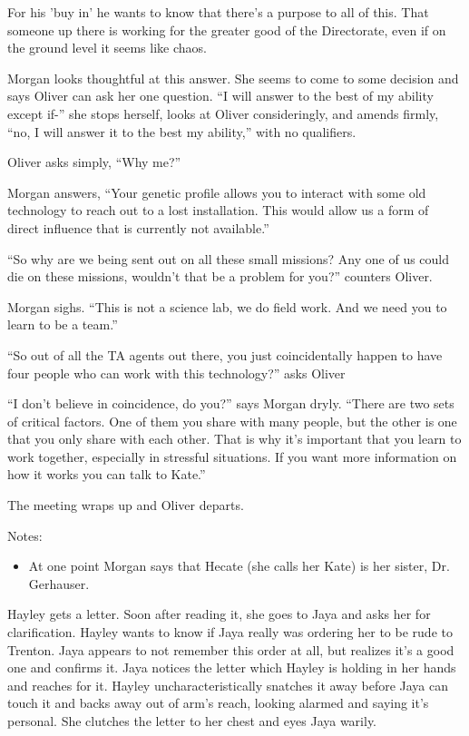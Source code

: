 For his 'buy in' he wants to know that there's a purpose to all of this.  That someone up there is working for the greater good of the Directorate, even if on the ground level it seems like chaos.



Morgan looks thoughtful at this answer.  She seems to come to some decision and says Oliver can ask her one question.  ``I will answer to the best of my ability except if-'' she stops herself, looks at Oliver consideringly, and amends firmly, ``no, I will answer it to the best my ability,'' with no qualifiers.



Oliver asks simply, ``Why me?''



Morgan answers, ``Your genetic profile allows you to interact with some old technology to reach out to a lost installation.  This would allow us a form of direct influence that is currently not available.''

``So why are we being sent out on all these small missions?  Any one of us could die on these missions, wouldn't that be a problem for you?'' counters Oliver.

Morgan sighs.  ``This is not a science lab, we do field work.  And we need you to learn to be a team.''

``So out of all the TA agents out there, you just coincidentally happen to have four people who can work with this technology?'' asks Oliver

``I don't believe in coincidence, do you?'' says Morgan dryly. ``There are two sets of critical factors.  One of them you share with many people, but the other is one that you only share with each other.  That is why it's important that you learn to work together, especially in stressful situations.  If you want more information on how it works you can talk to Kate.''



The meeting wraps up and Oliver departs.



Notes:

\begin{itemize}
\item At one point Morgan says that Hecate (she calls her Kate) is her sister, Dr. Gerhauser.
\end{itemize}



Hayley gets a letter.  Soon after reading it, she goes to Jaya and asks her for clarification. Hayley wants to know if Jaya really was ordering her to be rude to Trenton.  Jaya appears to not remember this order at all, but realizes it's a good one and confirms it.  Jaya notices the letter which Hayley is holding in her hands and reaches for it.  Hayley uncharacteristically snatches it away before Jaya can touch it and backs away out of arm's reach, looking alarmed and saying it's personal.  She clutches the letter to her chest and eyes Jaya warily.



